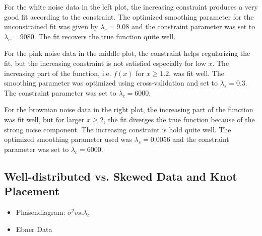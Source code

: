 \documentclass[10pt,a4paper]{article}
\begin{document}
For the white noise data in the left plot, the increasing constraint produces a very good fit according to the constraint. The optimized smoothing parameter for the unconstrained fit was given by $\lambda_s = 9.08$ and the constraint parameter was set to $\lambda_c = 9080$. The fit recovers the true function quite well. 

For the pink noise data in the middle plot, the constraint helps regularizing the fit, but the increasing constraint is not satisfied especially for low $x$. The increasing part of the function, i.e. $f(x)$ for $x \ge 1.2$,  was fit well. The smoothing parameter was optimized using cross-validation and set to $\lambda_s = 0.3$. The constraint parameter was set to $\lambda_c = 6000$. 

For the brownian noise data in the right plot, the increasing part of the function was fit well, but for larger $x \ge 2$, the fit diverges the true function because of the strong noise component. The increasing constraint is hold quite well. The optimized smoothing parameter used was $\lambda_s = 0.0056$ and the constraint parameter was set to $\lambda_c = 6000$.

\subsection{Well-distributed vs. Skewed Data and Knot Placement}


\begin{itemize}
	\item Phasendiagram: $\sigma^2 vs. \lambda_c$
	\item Ebner Data
\end{itemize}
\end{document}
